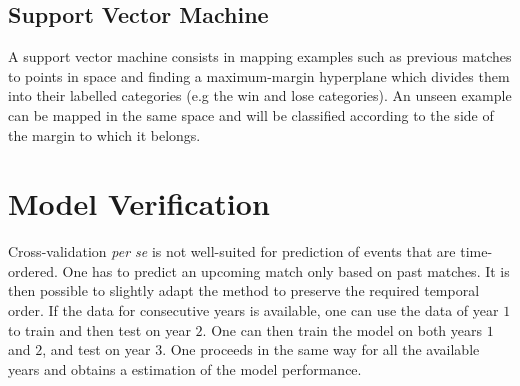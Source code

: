 \documentclass[a4paper,9pt]{report}
\theoremstyle{mytheor}
\begin{document}
\subsection{Support Vector Machine}
A support vector machine consists in mapping examples such as previous matches to points in space and finding a maximum-margin hyperplane which divides them into their labelled categories (e.g the win and lose categories). An unseen example can be mapped in the same space and will be classified according to the side of the margin to which it belongs.

\section{Model Verification}
Cross-validation \textit{per se} is not well-suited for prediction of events that are time-ordered.
One has to predict an upcoming match only based on past matches.
It is then possible to slightly adapt the method to preserve the required temporal order.
If the data for consecutive years is available, one can use the data of year $1$ to train
and then test on year $2$. One can then train the model on both years $1$ and $2$, and test on
year $3$. One proceeds in the same way for all the available years and obtains a estimation
of the model performance.

\end{document}
